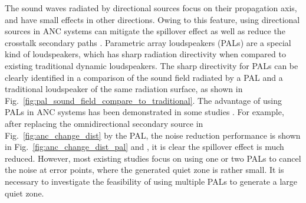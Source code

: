 The sound waves radiated by directional sources focus on their propagation axis, and have small effects in other directions.
Owing to this feature, using directional sources in ANC systems can mitigate the spillover effect \cite{Mangiante1977ActiveSoundAbsorption, Chen2011ActiveNoiseBarrier, Hu2019ActiveCancellationSound} as well as reduce the crosstalk secondary paths \cite{Tanaka2014MultichannelActiveNoise, Tanaka2017BinauralActiveNoise}. 
Parametric array loudspeakers (PALs) are a special kind of loudspeakers, which has sharp radiation directivity when compared to existing traditional dynamic loudspeakers. %
The sharp directivity for PALs can be clearly identified in a comparison of the sound field radiated by a PAL and a traditional loudspeaker of the same radiation surface, as shown in  Fig.~\ref{fig:pal_sound_field_compare_to_traditional}.
The advantage of using PALs in ANC systems has been demonstrated in some studies \cite{Tanaka2010ActiveNoiseControl, Tanaka2011MathematicallyTrivialControl, Tanaka2014MultichannelActiveNoise, Tanaka2017BinauralActiveNoise}. 
For example, after replacing the omnidirectional secondary source in Fig.~\ref{fig:anc_change_dist} by the PAL, the noise reduction performance is shown in Fig.~\ref{fig:anc_change_dist_pal} and , it is clear the spillover effect is much reduced.
However, most existing studies focus on using one or two PALs to cancel the noise at error points, where the generated quiet zone is rather small.
It is necessary to investigate the feasibility of using multiple PALs to generate a large quiet zone.

